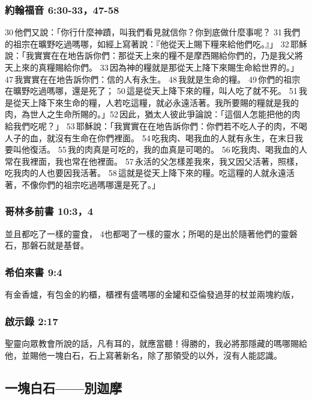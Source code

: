 \subsubsection{約翰福音 6:30-33，47-58}
30 他們又說：「你行什麼神蹟，叫我們看見就信你？你到底做什麼事呢？ 31 我們的祖宗在曠野吃過嗎哪，如經上寫著說：『他從天上賜下糧來給他們吃。』」 32 耶穌說：「我實實在在地告訴你們：那從天上來的糧不是摩西賜給你們的，乃是我父將天上來的真糧賜給你們。 33 因為神的糧就是那從天上降下來賜生命給世界的。」 47 我實實在在地告訴你們：信的人有永生。 48 我就是生命的糧。 49 你們的祖宗在曠野吃過嗎哪，還是死了； 50 這是從天上降下來的糧，叫人吃了就不死。 51 我是從天上降下來生命的糧，人若吃這糧，就必永遠活著。我所要賜的糧就是我的肉，為世人之生命所賜的。」52 因此，猶太人彼此爭論說：「這個人怎能把他的肉給我們吃呢？」 53 耶穌說：「我實實在在地告訴你們：你們若不吃人子的肉，不喝人子的血，就沒有生命在你們裡面。 54 吃我肉、喝我血的人就有永生，在末日我要叫他復活。 55 我的肉真是可吃的，我的血真是可喝的。 56 吃我肉、喝我血的人常在我裡面，我也常在他裡面。 57 永活的父怎樣差我來，我又因父活著，照樣，吃我肉的人也要因我活著。 58 這就是從天上降下來的糧。吃這糧的人就永遠活著，不像你們的祖宗吃過嗎哪還是死了。」

\subsubsection{哥林多前書 10:3，4}
並且都吃了一樣的靈食， 4也都喝了一樣的靈水；所喝的是出於隨著他們的靈磐石，那磐石就是基督。

\subsubsection{希伯來書 9:4}
有金香爐，有包金的約櫃，櫃裡有盛嗎哪的金罐和亞倫發過芽的杖並兩塊約版，

\subsubsection{啟示錄 2:17}
聖靈向眾教會所說的話，凡有耳的，就應當聽！得勝的，我必將那隱藏的嗎哪賜給他，並賜他一塊白石，石上寫著新名，除了那領受的以外，沒有人能認識。

\subsection{一塊白石——別迦摩}

